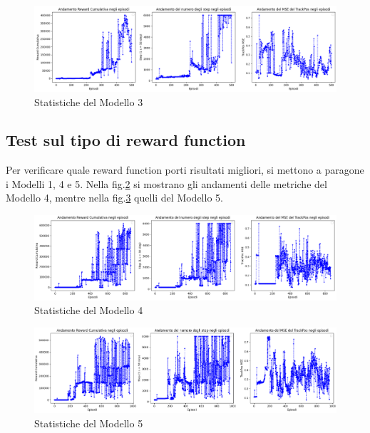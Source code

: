 \begin{figure}[hb]
    \centering
    \includegraphics[width = 6in]{Figures/Chapter5/model_3.png}
    \caption{Statistiche del Modello 3}
    \label{fig:model_3}
\end{figure}

\clearpage

\subsection{Test sul tipo di reward function}

Per verificare quale reward function porti risultati migliori, si mettono a paragone i Modelli 1, 4 e 5. Nella fig.\ref{fig:model_4} si mostrano gli andamenti delle metriche del Modello 4, mentre nella fig.\ref{fig:model_5} quelli del Modello 5.

\begin{figure}[hb]
    \centering
    \includegraphics[width = 6in]{Figures/Chapter5/model_4.png}
    \caption{Statistiche del Modello 4}
    \label{fig:model_4}
\end{figure}

\begin{figure}[hb]
    \centering
    \includegraphics[width = 6in]{Figures/Chapter5/model_5.png}
    \caption{Statistiche del Modello 5}
    \label{fig:model_5}
\end{figure}

